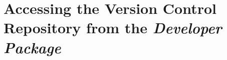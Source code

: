 \documentclass[12pt]{article}
\begin{document}

%   






\section*{Accessing the Version Control Repository from the {\it Developer Package}}

\end{document}
